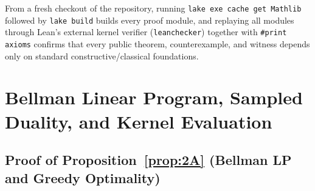 \documentclass[11pt,letterpaper]{article}
\theoremstyle{definition}
\begin{document}
From a fresh checkout of the repository, running \texttt{lake exe cache get Mathlib} followed by \texttt{lake build} builds every proof module, and replaying all modules through Lean's external kernel verifier (\texttt{leanchecker}) together with \texttt{\#print axioms} confirms that every public theorem, counterexample, and witness depends only on standard constructive/classical foundations.

\clearpage
\appendix
{}

\section{Bellman Linear Program, Sampled Duality, and Kernel Evaluation}
\label{app:duality}

\subsection{Proof of Proposition~\ref{prop:2A} (Bellman LP and Greedy Optimality)}
\label{app:bellman}
\end{document}
